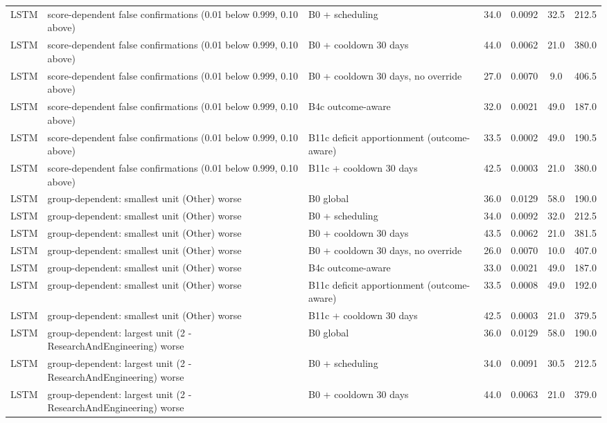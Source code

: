 \documentclass[10pt,onecolumn,letterpaper]{article}
\begin{document}
\begin{longtable}{lp{5.2cm}p{4.4cm}cccc}
LSTM & score-dependent false confirmations (0.01 below 0.999, 0.10 above) & B0 + scheduling & 34.0 & 0.0092 & 32.5 & 212.5 \\
LSTM & score-dependent false confirmations (0.01 below 0.999, 0.10 above) & B0 + cooldown 30 days & 44.0 & 0.0062 & 21.0 & 380.0 \\
LSTM & score-dependent false confirmations (0.01 below 0.999, 0.10 above) & B0 + cooldown 30 days, no override & 27.0 & 0.0070 & 9.0 & 406.5 \\
LSTM & score-dependent false confirmations (0.01 below 0.999, 0.10 above) & B4c outcome-aware & 32.0 & 0.0021 & 49.0 & 187.0 \\
LSTM & score-dependent false confirmations (0.01 below 0.999, 0.10 above) & B11c deficit apportionment (outcome-aware) & 33.5 & 0.0002 & 49.0 & 190.5 \\
LSTM & score-dependent false confirmations (0.01 below 0.999, 0.10 above) & B11c + cooldown 30 days & 42.5 & 0.0003 & 21.0 & 380.0 \\
LSTM & group-dependent: smallest unit (Other) worse & B0 global & 36.0 & 0.0129 & 58.0 & 190.0 \\
LSTM & group-dependent: smallest unit (Other) worse & B0 + scheduling & 34.0 & 0.0092 & 32.0 & 212.5 \\
LSTM & group-dependent: smallest unit (Other) worse & B0 + cooldown 30 days & 43.5 & 0.0062 & 21.0 & 381.5 \\
LSTM & group-dependent: smallest unit (Other) worse & B0 + cooldown 30 days, no override & 26.0 & 0.0070 & 10.0 & 407.0 \\
LSTM & group-dependent: smallest unit (Other) worse & B4c outcome-aware & 33.0 & 0.0021 & 49.0 & 187.0 \\
LSTM & group-dependent: smallest unit (Other) worse & B11c deficit apportionment (outcome-aware) & 33.5 & 0.0008 & 49.0 & 192.0 \\
LSTM & group-dependent: smallest unit (Other) worse & B11c + cooldown 30 days & 42.5 & 0.0003 & 21.0 & 379.5 \\
LSTM & group-dependent: largest unit (2 - ResearchAndEngineering) worse & B0 global & 36.0 & 0.0129 & 58.0 & 190.0 \\
LSTM & group-dependent: largest unit (2 - ResearchAndEngineering) worse & B0 + scheduling & 34.0 & 0.0091 & 30.5 & 212.5 \\
LSTM & group-dependent: largest unit (2 - ResearchAndEngineering) worse & B0 + cooldown 30 days & 44.0 & 0.0063 & 21.0 & 379.0 \\

\end{longtable}
\end{document}
